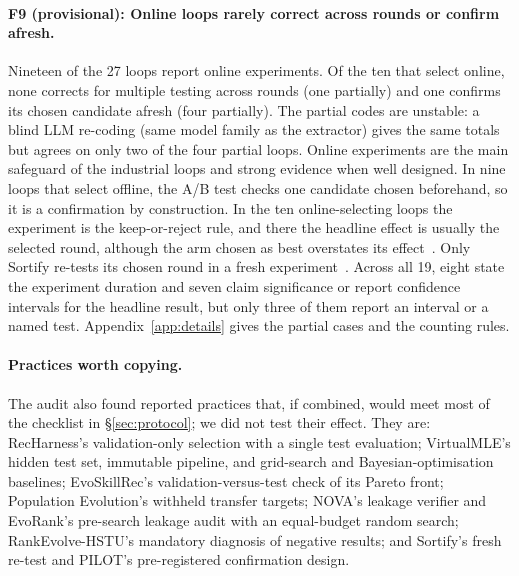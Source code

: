 \documentclass[sigconf,nonacm]{acmart}
\begin{document}
\paragraph{F9 (provisional): Online loops rarely correct across rounds or confirm afresh.} Nineteen of the 27 loops report online
experiments. Of the ten that select online, none corrects for multiple testing across rounds (one partially) and one confirms its chosen candidate afresh (four partially). The partial codes are unstable: a blind LLM re-coding (same model family as the extractor) gives the same totals but agrees on only two of the four partial loops. Online experiments are the main safeguard of the industrial loops and strong evidence when well designed. In nine loops that select offline, the A/B
test checks one candidate chosen beforehand, so it is a confirmation by construction. In the ten
online-selecting loops the experiment is the keep-or-reject rule, and there the headline effect is usually the
selected round, although the arm chosen as best overstates its effect~\cite{lee2018winnerscurse,berman2026winners}. Only Sortify re-tests its chosen round in a fresh
experiment~\cite{cheng2026sortify}. Across all 19, eight state the experiment duration and seven claim
significance or report confidence intervals for the headline result, but only three of them report an interval or a named test. Appendix~\ref{app:details} gives the partial cases and the counting rules.

\paragraph{Practices worth copying.} The audit also found reported practices that, if combined, would meet most of the
checklist in \S\ref{sec:protocol}; we did not test their effect. They are:
RecHarness's validation-only selection with a single test evaluation; VirtualMLE's
hidden test set, immutable pipeline, and grid-search and Bayesian-optimisation baselines; EvoSkillRec's validation-versus-test check of its
Pareto front; Population Evolution's withheld transfer targets; NOVA's leakage verifier and EvoRank's pre-search
leakage audit with an equal-budget random search; RankEvolve-HSTU's mandatory diagnosis of negative results; and
Sortify's fresh re-test and PILOT's pre-registered confirmation design.
\end{document}
